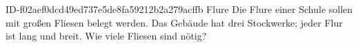 \begin{exercise}
      {ID-f02aef0dcd49ed737e5de8fa59212b2a279acffb}
      {Flure}
  \ifproblem\problem
    Die Flure einer Schule sollen mit  großen Fliesen belegt werden.
    Das Gebäude hat drei Stockwerke; jeder Flur ist  lang und 
    breit. Wie viele Fliesen sind nötig?
  \fi
\end{exercise}
